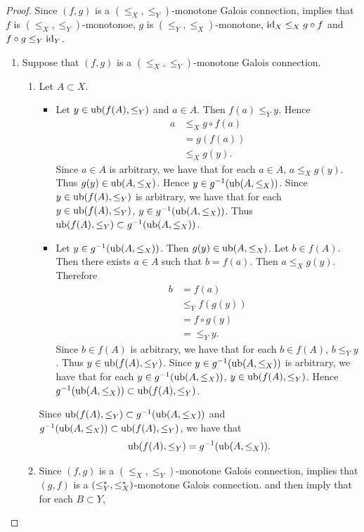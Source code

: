 \documentclass{book}
\begin{document}
	\begin{proof}
		Since $(f,g)$ is a $(\leq_X, \leq_Y)$-monotone Galois connection,  implies that $f$ is $(\leq_X, \leq_Y)$-monotonoe, $g$ is $(\leq_Y, \leq_X)$-monotone, $\operatorname{id}_X \leq_X g \circ f$ and $f \circ g \leq_Y \operatorname{id}_Y$.
		\begin{enumerate}
			\item Suppose that $(f,g)$ is a $(\leq_X, \leq_Y)$-monotone Galois connection. 
			\begin{enumerate}
				\item Let $A \subset X$.
				\begin{itemize}
					\item Let $y \in \operatorname{ub}(f(A), \leq_Y)$ and $a \in A$. Then $f(a) \leq_Y y$. Hence
					\begin{align*}
						a
						& \leq_X g \circ f(a) \\
						& = g (f(a)) \\
						& \leq_X g(y).
					\end{align*} 
					Since $a \in A$ is arbitrary, we have that for each $a \in A$, $a \leq_X g(y)$. Thus $g(y) \in \operatorname{ub}(A, \leq_X)$. Hence $y \in g^{-1}(\operatorname{ub}(A, \leq_X))$. Since $y \in \operatorname{ub}(f(A), \leq_Y)$ is arbitrary, we have that for each $y \in \operatorname{ub}(f(A), \leq_Y)$, $y \in g^{-1}(\operatorname{ub}(A, \leq_X))$. Thus $\operatorname{ub}(f(A), \leq_Y) \subset g^{-1}(\operatorname{ub}(A, \leq_X))$.
					\item Let $y \in g^{-1}(\operatorname{ub}(A, \leq_X))$. Then $g(y) \in \operatorname{ub}(A, \leq_X)$. Let $b \in f(A)$. Then there exists $a \in A$ such that $b = f(a)$. Then $a \leq_X g(y)$. Therefore
					\begin{align*}
						b
						& = f(a) \\
						& \leq_Y f(g(y)) \\
						& = f \circ g(y) \\
						& = \leq_Y y.
					\end{align*}
					Since $b \in f(A)$ is arbitrary, we have that for each $b \in f(A)$, $b \leq_Y y$. Thus $y \in \operatorname{ub}(f(A), \leq_Y)$. Since $y \in g^{-1}(\operatorname{ub}(A, \leq_X))$ is arbitrary, we have that for each $y \in g^{-1}(\operatorname{ub}(A, \leq_X))$, $y \in \operatorname{ub}(f(A), \leq_Y)$. Hence $g^{-1}(\operatorname{ub}(A, \leq_X)) \subset \operatorname{ub}(f(A), \leq_Y)$. 
				\end{itemize} 
				Since $\operatorname{ub}(f(A), \leq_Y) \subset g^{-1}(\operatorname{ub}(A, \leq_X))$ and $g^{-1}(\operatorname{ub}(A, \leq_X)) \subset \operatorname{ub}(f(A), \leq_Y)$, we have that 
				$$\operatorname{ub}(f(A), \leq_Y) = g^{-1}(\operatorname{ub}(A, \leq_X)).$$ 
				\item Since $(f,g)$ is a $(\leq_X, \leq_Y)$-monotone Galois connection,  implies that $(g, f)$ is a $(\leq^*_Y, \leq^*_X)$-monotone Galois connection.  and  then imply that for each $B \subset Y$, 

\end{enumerate}
\end{enumerate}
\end{proof}
\end{document}
